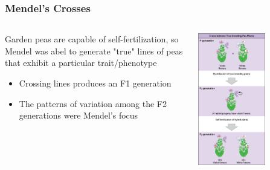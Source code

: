 \documentclass{beamer}
\begin{document}
\begin{frame}
	
	\frametitle{Mendel's Crosses}

	
\begin{columns}
	\begin{column}{0.5\textwidth}
			Garden peas are capable of self-fertilization, so Mendel was abel to generate "true" lines of peas that exhibit a particular trait/phenotype
		\begin{itemize}
	\item	Crossing lines produces an F1 generation 	
	\item 	The patterns of variation among the F2 generations were Mendel's focus
		\end{itemize}
		


	\end{column}
	\begin{column}{0.6\textwidth}  
\begin{center}
			\includegraphics[keepaspectratio, width  =0.6\textwidth]{img/mendelCross_1}
\end{center}
\end{column}
\end{columns}
\end{frame}
\end{document}

